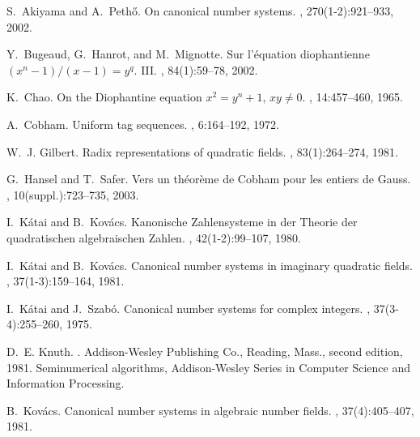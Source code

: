 \begin{thebibliography}{10}

S.~Akiyama and A.~Peth{\H{o}}.
\newblock On canonical number systems.
, 270(1-2):921--933, 2002.

Y.~Bugeaud, G.~Hanrot, and M.~Mignotte.
\newblock Sur l'\'equation diophantienne {$(x^n-1)/(x-1)=y^q$}. {III}.
, 84(1):59--78, 2002.

K.~Chao.
\newblock On the {D}iophantine equation {$x^{2}=y^{n}+1,\,xy\not=0$}.
, 14:457--460, 1965.

A.~Cobham.
\newblock Uniform tag sequences.
, 6:164--192, 1972.

W.~J. Gilbert.
\newblock Radix representations of quadratic fields.
, 83(1):264--274, 1981.

G.~Hansel and T.~Safer.
\newblock Vers un th\'eor\`eme de {C}obham pour les entiers de {G}auss.
, 10(suppl.):723--735, 2003.

I.~K{\'a}tai and B.~Kov{\'a}cs.
\newblock Kanonische {Z}ahlensysteme in der {T}heorie der quadratischen
  algebraischen {Z}ahlen.
, 42(1-2):99--107, 1980.

I.~K{\'a}tai and B.~Kov{\'a}cs.
\newblock Canonical number systems in imaginary quadratic fields.
, 37(1-3):159--164, 1981.

I.~K{\'a}tai and J.~Szab{\'o}.
\newblock Canonical number systems for complex integers.
, 37(3-4):255--260, 1975.

D.~E. Knuth.
.
\newblock Addison-Wesley Publishing Co., Reading, Mass., second edition, 1981.
\newblock Seminumerical algorithms, Addison-Wesley Series in Computer Science
  and Information Processing.

B.~Kov{\'a}cs.
\newblock Canonical number systems in algebraic number fields.
, 37(4):405--407, 1981.


\end{thebibliography}
